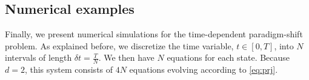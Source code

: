 \documentclass[12pt]{amsart}
\newcommand{\1}{{\chi}}
\theoremstyle{definition}
\begin{document}
 
     

 


\subsection{Numerical examples} 
\label{sec:numerical_implementation}
        








	





















             
        









	



















  
    Finally, we present numerical simulations for the  time-dependent paradigm-shift problem.
    As explained before, we discretize the time variable, $t \in [0,T]$, into $N$ intervals of length $\delta t=\frac{T}{N}$. 
    We then have $N$ equations for each state. Because $d=2$, 
    this system consists of $4N$ equations evolving according to 
    \eqref{eq:prj}. 
                
\end{document}
